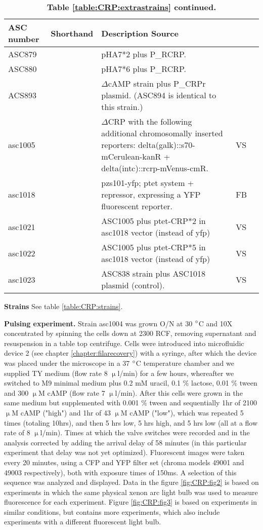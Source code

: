 \begin{table}[h]
    \begin{tabularx}{\textwidth}{llXll}
        	\textbf{ASC number}	& \textbf{Shorthand} & \textbf{Description}	\textbf{Source} \\
        \hline
ASC879	&		& pHA7*2 plus P\_RCRP.  & \\
ASC880	&		& pHA7*6 plus P\_RCRP.  & \\
%
ACS893	&		& $\Delta$cAMP strain plus P\_CRPr plasmid. (ASC894 is identical to this strain.) & \\
%
asc1005	& &	$\Delta$CRP with the following additional chromosomally inserted reporters: delta(galk)::s70-mCerulean-kanR + delta(intc)::rcrp-mVenus-cmR. & VS \\
asc1018	& &	pzs101-yfp; ptet system + repressor, expressing a YFP fluorescent reporter. & FB \\
asc1021	& &	ASC1005 plus ptet-CRP*2 in asc1018 vector (instead of yfp) & VS \\
asc1022	& &	ASC1005 plus ptet-CRP*5 in asc1018 vector (instead of yfp) & VS \\
asc1023	& & ASC838 strain plus ASC1018 plasmid (control). & VS \\
		\hline
	\end{tabularx}
	\caption{\textbf{Table \ref{table:CRP:extrastrains} continued.}}
\end{table}


\textbf{Strains} See table \ref{table:CRP:strains}.

\textbf{Pulsing experiment.} Strain asc1004 was grown O/N at 30 $\degree$C and 10X concentrated by spinning the cells down at 2300 RCF, removing supernatant and resuspension in a table top centrifuge.
Cells were introduced into microfluidic device 2 (see chapter \ref{chapter:filarecovery}) with a syringe, after which the device was placed under the microscope in a 37 $\degree$C temperature chamber and we supplied TY medium (flow rate 8 $\upmu$l/min) for a few hours, whereafter we switched to M9 minimal medium plus 0.2 mM uracil, 0.1 $\%$ lactose, 0.01 $\%$ tween and 300 $\upmu$M cAMP (flow rate 7 $\upmu$l/min).
After this cells were grown in the same medium but supplemented with 0.001 $\%$ tween and sequentially 1hr of 2100 $\upmu$M cAMP ("high") and 1hr of 43 $\upmu$M cAMP ("low"), which was repeated 5 times (totaling 10hrs), and then 5 hrs low, 5 hrs high, and 5 hrs low (all at a flow rate of 8 $\upmu$l/min). 
Times at which the valve switches were recorded and in the analysis corrected by adding the arrival delay of 58 minutes (in this particular experiment that delay was not yet optimized).
Fluorescent images were taken every 20 minutes, using a CFP and YFP filter set (chroma models 49001 and 49003 respectively), both with exposure times of 150ms.
A selection of this sequence was analyzed and displayed.  
Data in the figure \ref{fig:CRP:fig2} is based on experiments in which the same physical xenon arc light bulb was used to measure fluorescence for each experiment.
Figure \ref{fig:CRP:fig3} is based on experiments in similar conditions, but contains more experiments, which also include experiments with a different fluorescent light bulb.

